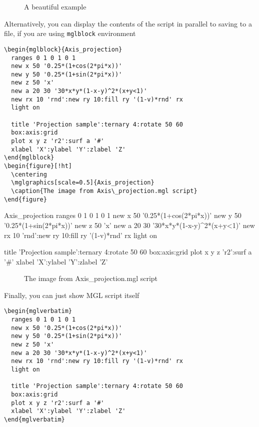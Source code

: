 \documentclass[12pt]{article}
\begin{document}
\begin{figure}[!ht]
  \centering
  \caption{A beautiful example}
\end{figure}

Alternatively, you can display the contents of the script in parallel to saving to a file, if you are using \texttt{mglblock} environment
\begin{verbatim}
\begin{mglblock}{Axis_projection}
  ranges 0 1 0 1 0 1
  new x 50 '0.25*(1+cos(2*pi*x))'
  new y 50 '0.25*(1+sin(2*pi*x))'
  new z 50 'x'
  new a 20 30 '30*x*y*(1-x-y)^2*(x+y<1)'
  new rx 10 'rnd':new ry 10:fill ry '(1-v)*rnd' rx
  light on
  
  title 'Projection sample':ternary 4:rotate 50 60
  box:axis:grid
  plot x y z 'r2':surf a '#'
  xlabel 'X':ylabel 'Y':zlabel 'Z'
\end{mglblock}
\begin{figure}[!ht]
  \centering
  \mglgraphics[scale=0.5]{Axis_projection}
  \caption{The image from Axis\_projection.mgl script}
\end{figure}
\end{verbatim}

\begin{mglblock}{Axis_projection}
  ranges 0 1 0 1 0 1
  new x 50 '0.25*(1+cos(2*pi*x))'
  new y 50 '0.25*(1+sin(2*pi*x))'
  new z 50 'x'
  new a 20 30 '30*x*y*(1-x-y)^2*(x+y<1)'
  new rx 10 'rnd':new ry 10:fill ry '(1-v)*rnd' rx
  light on
  
  title 'Projection sample':ternary 4:rotate 50 60
  box:axis:grid
  plot x y z 'r2':surf a '#'
  xlabel 'X':ylabel 'Y':zlabel 'Z'
\end{mglblock}
\begin{figure}[!ht]
  \centering
  \caption{The image from Axis\_projection.mgl script}
\end{figure}

Finally, you can just show MGL script itself
\begin{verbatim}
\begin{mglverbatim}
  ranges 0 1 0 1 0 1
  new x 50 '0.25*(1+cos(2*pi*x))'
  new y 50 '0.25*(1+sin(2*pi*x))'
  new z 50 'x'
  new a 20 30 '30*x*y*(1-x-y)^2*(x+y<1)'
  new rx 10 'rnd':new ry 10:fill ry '(1-v)*rnd' rx
  light on
  
  title 'Projection sample':ternary 4:rotate 50 60
  box:axis:grid
  plot x y z 'r2':surf a '#'
  xlabel 'X':ylabel 'Y':zlabel 'Z'
\end{mglverbatim}
\end{verbatim}
\end{document}
